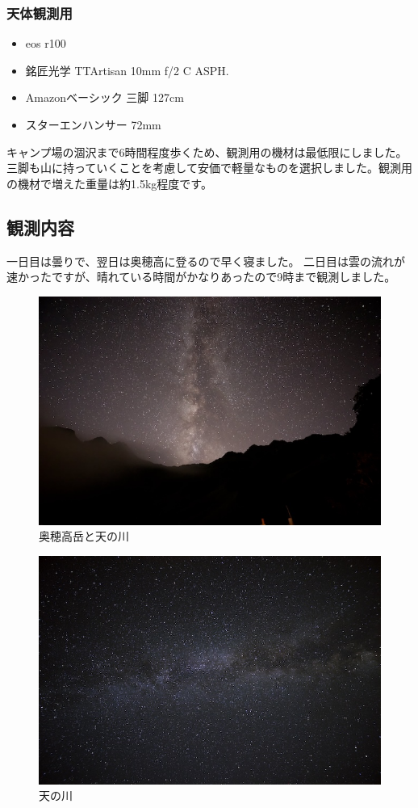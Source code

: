 \documentclass[../main]{subfiles}
\begin{document}
\subsubsection{天体観測用}

\begin{itemize}
  \item eos r100
  \item 銘匠光学 TTArtisan 10mm f/2 C ASPH.
  \item Amazonベーシック 三脚 127cm
  \item スターエンハンサー 72mm
\end{itemize}

キャンプ場の涸沢まで6時間程度歩くため、観測用の機材は最低限にしました。三脚も山に持っていくことを考慮して安価で軽量なものを選択しました。観測用の機材で増えた重量は約1.5kg程度です。

\subsection{観測内容}
一日目は曇りで、翌日は奥穂高に登るので早く寝ました。
二日目は雲の流れが速かったですが、晴れている時間がかなりあったので9時まで観測しました。\\

\begin{figure}[H]
  \centering
  \includegraphics[width=0.7\linewidth]{sections/mori/IMG_2378.jpg}
  \caption{奥穂高岳と天の川}
\end{figure}

\begin{figure}[H]
  \centering
  \includegraphics[width=0.7\linewidth]{sections/mori/amanogawa_okuhotaka_busiyou.jpg}
  \caption{天の川}
\end{figure}
\end{document}
